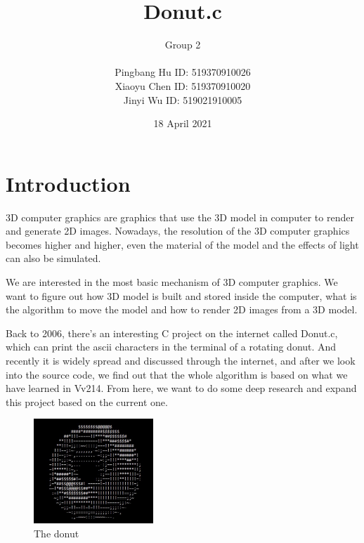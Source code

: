 \documentclass{article}
\title{\Huge {Donut.c}}
\author{Group 2 \\ \\
Pingbang Hu ID: 519370910026 \\
Xiaoyu Chen ID: 519370910020 \\
Jinyi Wu ID: 519021910005}
\date{18 April 2021}
\begin{document}
\maketitle
\section{Introduction}

\par 3D computer graphics are graphics that use the 3D model in computer to render and generate 2D images. 
Nowadays, the resolution of the 3D computer graphics becomes higher and higher, even the material of the model and the effects of light can also be simulated.

\par We are interested in the most basic mechanism of 3D computer graphics. 
We want to figure out how 3D model is built and stored inside the computer, what is the algorithm to move the model and how to render 2D images from a 3D model.

\par Back to 2006, there's an interesting C project on the internet called Donut.c, which can print the ascii characters in the terminal of a rotating donut. 
And recently it is widely spread and discussed through the internet, and after we look into the source code, we find out that the whole algorithm is based on what we have learned in Vv214. 
From here, we want to do some deep research and expand this project based on the current one.

\begin{figure}[H]
  \centering
  \includegraphics[width=0.4\textwidth]{Figures/donut.jpg}
  \caption{The donut}
\end{figure}

\end{document}
